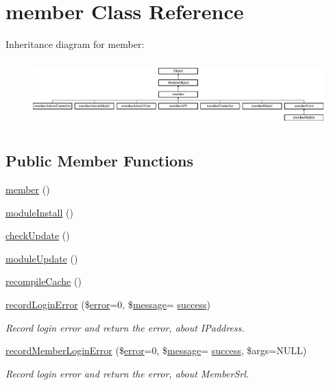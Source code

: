 \hypertarget{classmember}{}\section{member Class Reference}
\label{classmember}
Inheritance diagram for member\+:\begin{figure}[H]
\begin{center}
\leavevmode
\includegraphics[height=2.580645cm]{classmember}
\end{center}
\end{figure}
\subsection*{Public Member Functions}
\begin{DoxyCompactItemize}
\item 
\hyperlink{classmember_a4153f13605eac8adf8dde89ee7d18c02}{member} ()
\item 
\hyperlink{classmember_a5834fa338d03eedcb5e84bb8ccac305b}{module\+Install} ()
\item 
\hyperlink{classmember_ad28f96bfab17efa94a9f2607a8b42a3d}{check\+Update} ()
\item 
\hyperlink{classmember_a72b7382e568644ccadb69b67e4504086}{module\+Update} ()
\item 
\hyperlink{classmember_ab5bc32f3821f7cba98e34703679c69ee}{recompile\+Cache} ()
\item 
\hyperlink{classmember_a557d0a329f29c5490a53c6e5a58dcab9}{record\+Login\+Error} (\$\hyperlink{common_2js_2jquery_8js_ad9c7b7332a24ed93fb21cd053c99bd12}{error}=0, \$\hyperlink{classmessage}{message}= \textquotesingle{}\hyperlink{jquery_8oembed_8js_a20d50bae920793dd76c2f5b4c6fd9803}{success}\textquotesingle{})
\begin{DoxyCompactList}\small\item\em Record login error and return the error, about I\+Paddress. \end{DoxyCompactList}\item 
\hyperlink{classmember_a629cfb29393b629f0b39e4467a3d44d4}{record\+Member\+Login\+Error} (\$\hyperlink{common_2js_2jquery_8js_ad9c7b7332a24ed93fb21cd053c99bd12}{error}=0, \$\hyperlink{classmessage}{message}= \textquotesingle{}\hyperlink{jquery_8oembed_8js_a20d50bae920793dd76c2f5b4c6fd9803}{success}\textquotesingle{}, \$args=N\+U\+LL)
\begin{DoxyCompactList}\small\item\em Record login error and return the error, about Member\+Srl. \end{DoxyCompactList}\end{DoxyCompactItemize}
